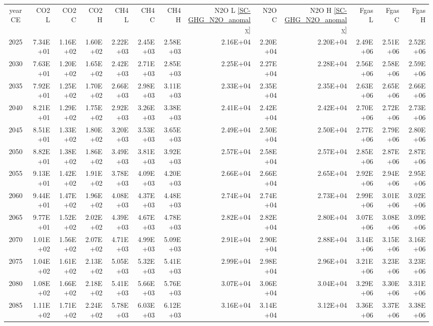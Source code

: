 \documentclass{article}
\begin{document}
\begin{table}
\begin{tabular}{crrr|rrr|rrr|rrr}
year CE  & CO2 L    & CO2 C    & CO2 H    & CH4 L    & CH4 C    & CH4 H    & N2O L \ref{SC-GHG_N2O_anomaly}     & N2O C      & N2O H \ref{SC-GHG_N2O_anomaly}    & Fgas L   & Fgas C   & Fgas H   \\
2025     & 7.34E+01 & 1.16E+02 & 1.60E+02 & 2.22E+03 & 2.45E+03 & 2.58E+03 & 2.16E+04 & 2.20E+04 & 2.20E+04 & 2.49E+06 & 2.51E+06 & 2.52E+06 \\
2030     & 7.63E+01 & 1.20E+02 & 1.65E+02 & 2.42E+03 & 2.71E+03 & 2.85E+03 & 2.25E+04 & 2.27E+04 & 2.28E+04 & 2.56E+06 & 2.58E+06 & 2.59E+06 \\
2035     & 7.92E+01 & 1.25E+02 & 1.70E+02 & 2.66E+03 & 2.98E+03 & 3.11E+03 & 2.33E+04 & 2.35E+04 & 2.35E+04 & 2.63E+06 & 2.65E+06 & 2.66E+06 \\
2040     & 8.21E+01 & 1.29E+02 & 1.75E+02 & 2.92E+03 & 3.26E+03 & 3.38E+03 & 2.41E+04 & 2.42E+04 & 2.42E+04 & 2.70E+06 & 2.72E+06 & 2.73E+06 \\
2045     & 8.51E+01 & 1.33E+02 & 1.80E+02 & 3.20E+03 & 3.53E+03 & 3.65E+03 & 2.49E+04 & 2.50E+04 & 2.50E+04 & 2.77E+06 & 2.79E+06 & 2.80E+06 \\
2050     & 8.82E+01 & 1.38E+02 & 1.86E+02 & 3.49E+03 & 3.81E+03 & 3.92E+03 & 2.57E+04 & 2.58E+04 & 2.57E+04 & 2.85E+06 & 2.87E+06 & 2.87E+06 \\
2055     & 9.13E+01 & 1.42E+02 & 1.91E+02 & 3.78E+03 & 4.09E+03 & 4.20E+03 & 2.66E+04 & 2.66E+04 & 2.65E+04 & 2.92E+06 & 2.94E+06 & 2.95E+06 \\
2060     & 9.44E+01 & 1.47E+02 & 1.96E+02 & 4.08E+03 & 4.37E+03 & 4.48E+03 & 2.74E+04 & 2.74E+04 & 2.73E+04 & 2.99E+06 & 3.01E+06 & 3.02E+06 \\
2065     & 9.77E+01 & 1.52E+02 & 2.02E+02 & 4.39E+03 & 4.67E+03 & 4.78E+03 & 2.82E+04 & 2.82E+04 & 2.80E+04 & 3.07E+06 & 3.08E+06 & 3.09E+06 \\
2070     & 1.01E+02 & 1.56E+02 & 2.07E+02 & 4.71E+03 & 4.99E+03 & 5.09E+03 & 2.91E+04 & 2.90E+04 & 2.88E+04 & 3.14E+06 & 3.15E+06 & 3.16E+06 \\
2075     & 1.04E+02 & 1.61E+02 & 2.13E+02 & 5.05E+03 & 5.32E+03 & 5.41E+03 & 2.99E+04 & 2.98E+04 & 2.96E+04 & 3.21E+06 & 3.23E+06 & 3.23E+06 \\
2080     & 1.08E+02 & 1.66E+02 & 2.18E+02 & 5.41E+03 & 5.66E+03 & 5.76E+03 & 3.07E+04 & 3.06E+04 & 3.04E+04 & 3.29E+06 & 3.30E+06 & 3.31E+06 \\
2085     & 1.11E+02 & 1.71E+02 & 2.24E+02 & 5.78E+03 & 6.03E+03 & 6.12E+03 & 3.16E+04 & 3.14E+04 & 3.12E+04 & 3.36E+06 & 3.37E+06 & 3.38E+06 \\

\end{tabular}
\end{table}
\end{document}
